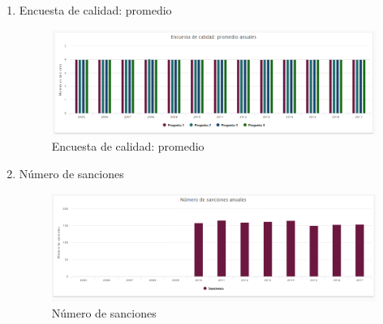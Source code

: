 \begin{itemize}
\begin{enumerate}
	\item Encuesta de calidad: promedio
	\begin{figure}[hbtp]
	\includegraphics[scale=0.7]{images/Interfaz/IUGS15_encuestaCalidadTodos.PNG}
	\caption{Encuesta de calidad: promedio}
	\end{figure}
	
	\item Número de sanciones 
	\begin{figure}[hbtp]
	\includegraphics[scale=0.7]{images/Interfaz/IUGS15_sancionesTodos.PNG}
	\caption{Número de sanciones}
	\end{figure}
	
	\end{enumerate}
	
\end{itemize}